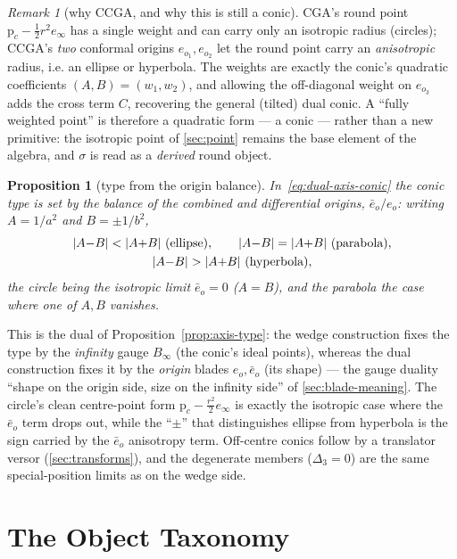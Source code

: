 \documentclass{birkjour}
\newtheorem{proposition}[theorem]{Proposition}
\theoremstyle{definition}
\theoremstyle{remark}
\newtheorem{remark}[theorem]{Remark}
\newcommand{\einf}{e_\infty}
\newcommand{\eobar}{\bar e_o}
\begin{document}
\begin{remark}[why CCGA, and why this is still a conic]\label{rem:two-origins}
CGA's round point $\mathrm{p}_c-\tfrac12 r^2\einf$ has a single weight and can
carry only an isotropic radius (circles); CCGA's \emph{two} conformal origins
$e_{o_1},e_{o_2}$ let the round point carry an \emph{anisotropic} radius, i.e. an
ellipse or hyperbola. The weights are exactly the conic's quadratic coefficients
$(A,B)=(w_1,w_2)$, and allowing the off-diagonal weight on $e_{o_3}$ adds the cross
term $C$, recovering the general (tilted) dual conic. A ``fully weighted point''
is therefore a quadratic form --- a conic --- rather than a new primitive: the
isotropic point of \cref{sec:point} remains the base element of the algebra, and
$\sigma$ is read as a \emph{derived} round object.
\end{remark}

\begin{proposition}[type from the origin balance]\label{prop:dual-axis-type}
In~\eqref{eq:dual-axis-conic} the conic type is set by the balance of the
combined and differential origins, $\eobar/e_o$: writing $A=1/a^2$ and
$B=\pm1/b^2$,
\begin{gather}
  |A{-}B|<|A{+}B|\ (\text{ellipse}),\qquad
  |A{-}B|=|A{+}B|\ (\text{parabola}),\notag\\
  |A{-}B|>|A{+}B|\ (\text{hyperbola}),
\end{gather}
the circle being the isotropic limit $\eobar=0$ ($A=B$), and the parabola the
case where one of $A,B$ vanishes.
\end{proposition}

This is the dual of Proposition~\ref{prop:axis-type}: the wedge construction fixes the type by
the \emph{infinity} gauge $B_\infty$ (the conic's ideal points), whereas the dual
construction fixes it by the \emph{origin} blades $e_o,\eobar$ (its shape) --- the
gauge duality ``shape on the origin side, size on the infinity side'' of
\cref{sec:blade-meaning}. The circle's clean centre-point form
$\mathrm{p}_c-\tfrac{r^2}{2}\einf$ is exactly the isotropic case where the
$\eobar$ term drops out, while the ``$\pm$'' that distinguishes ellipse from
hyperbola is the sign carried by the $\eobar$ anisotropy term. Off-centre conics
follow by a translator versor (\cref{sec:transforms}), and the degenerate members
($\Delta_3=0$) are the same special-position limits as on the wedge side.

\section{The Object Taxonomy}
\label{sec:taxonomy}
\end{document}
